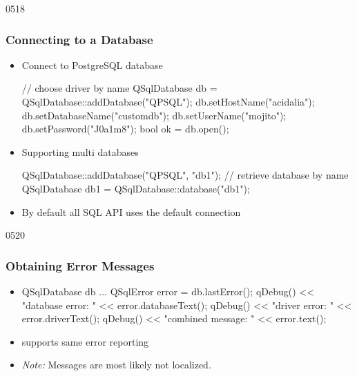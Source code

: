 \begin{slide}[fragile]{0518}\frametitle{Connecting to a Database}
\begin{itemize}
\item Connect to PostgreSQL database
  \begin{cpp}
// choose driver by name
QSqlDatabase db = QSqlDatabase::addDatabase("QPSQL");
db.setHostName("acidalia");
db.setDatabaseName("customdb");
db.setUserName("mojito");
db.setPassword("J0a1m8");
bool ok = db.open();    
  \end{cpp}

\item Supporting multi databases
  \begin{cpp}
QSqlDatabase::addDatabase("QPSQL", "db1");
// retrieve database by name
QSqlDatabase db1 = QSqlDatabase::database("db1");
  \end{cpp}
\item By default all SQL API uses the default connection 
\end{itemize}
\end{slide}

\begin{slide}[fragile]{0520}\frametitle{Obtaining Error Messages}
\begin{itemize}
\item \textbf{}
  \begin{cpp}
QSqlDatabase db ...
QSqlError error = db.lastError();    
qDebug() << "database error: " << error.databaseText();
qDebug() << "driver error: " << error.driverText();
qDebug() << "combined message: " << error.text();
  \end{cpp}
\item {} supports same error reporting
\item \textit{Note: } Messages are most likely not localized. 
\end{itemize}
\end{slide}

